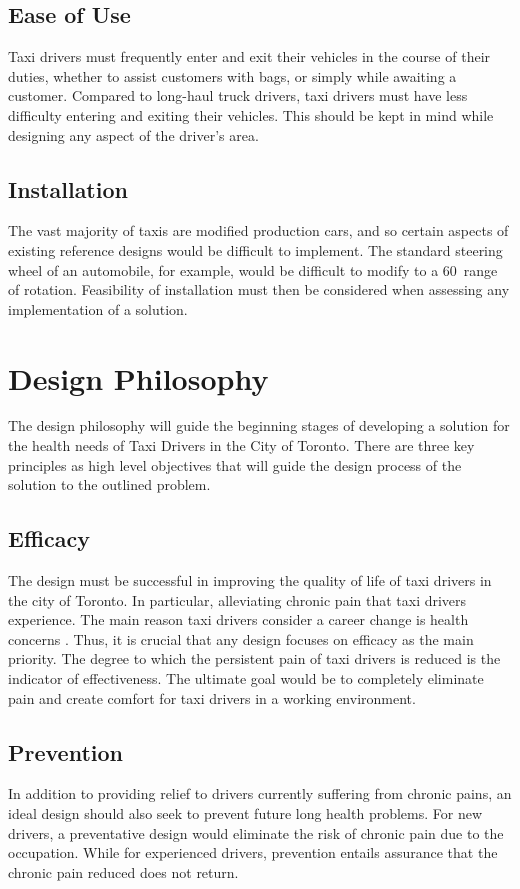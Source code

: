 \documentclass[11pt]{article}
\begin{document}
\subsection{Ease of Use}
\label{sec:ease}
Taxi drivers must frequently enter and exit their vehicles in the course of
their duties, whether to assist customers with bags, or simply while awaiting
a customer. Compared to long-haul truck drivers, taxi drivers must have less
difficulty entering and exiting their vehicles. This should be kept in mind
while designing any aspect of the driver's area.
\subsection{Installation}
\label{sec:installation}

The vast majority of taxis are modified production cars, %
and so certain aspects of existing reference designs would be difficult to
implement. The standard steering wheel of an automobile, for example,
would be difficult to modify to a 60\textdegree~range of
rotation\cite{Ismail2003}. Feasibility of installation must then
be considered when assessing any implementation of a solution.

\section{Design Philosophy}
\label{sec:philo}
The design philosophy will guide the beginning stages of developing a
solution for the health needs of Taxi Drivers in the City of
Toronto. There are three key principles as high level objectives that
will guide the design process of the solution to the outlined problem.
 
\subsection{Efficacy}
The design must be successful in improving the quality of life of taxi 
drivers in the city of Toronto. In particular, alleviating chronic pain 
that taxi drivers experience. The main reason taxi drivers consider a 
career change is health concerns \cite{chicago}. Thus, it is crucial that 
any design focuses on efficacy as the main priority. The degree to which 
the persistent pain of taxi drivers is reduced is the indicator of 
effectiveness. The ultimate goal would be to completely eliminate pain 
and create comfort for taxi drivers in a working environment. 

\subsection{Prevention}
In addition to providing relief to drivers currently suffering from 
chronic pains, an ideal design should also seek to prevent future long 
health problems. For new drivers, a preventative design would eliminate
the risk of chronic pain due to the occupation. While for experienced 
drivers, prevention entails assurance that the chronic pain reduced does
not return. 
 
\end{document}
